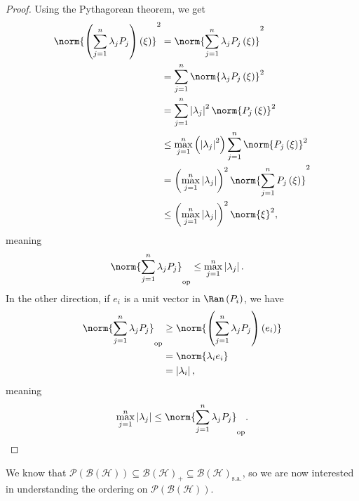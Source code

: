 \documentclass[10pt]{mypackage}
\newcommand{\sa}{\text{s.a.}}
\begin{document}
\begin{proof}
  Using the Pythagorean theorem, we get
  \begin{align*}
    \norm{\left(\sum_{j=1}^{n}\lambda_jP_j\right)\left(\xi\right)}^2 &= \norm{\sum_{j=1}^{n}\lambda_jP_j\left(\xi\right)}^2\\
                                                                     &= \sum_{j=1}^{n}\norm{\lambda_jP_j\left(\xi\right)}^2\\
                                                                     &= \sum_{j=1}^{n}\left\vert \lambda_j \right\vert^2\norm{P_j\left(\xi\right)}^2\\
                                                                     &\leq \max_{j=1}^{n}\left(\left\vert \lambda_j \right\vert^2\right)\sum_{j=1}^{n}\norm{P_j\left(\xi\right)}^2\\
                                                                     &= \left(\max_{j=1}^{n} \left\vert \lambda_j \right\vert\right)^2\norm{\sum_{j=1}^{n}P_j\left(\xi\right)}^2\\
                                                                     &\leq \left(\max_{j=1}^{n}\left\vert \lambda_j \right\vert\right)^2\norm{\xi}^2,
  \end{align*}
  meaning
  \begin{align*}
    \norm{\sum_{j=1}^{n}\lambda_jP_j}_{\text{op}} &\leq \max_{j=1}^{n}\left\vert \lambda_j \right\vert.
  \end{align*}
  In the other direction, if $e_i$ is a unit vector in $\Ran\left(P_i\right)$, we have
  \begin{align*}
    \norm{\sum_{j=1}^{n}\lambda_jP_j}_{\text{op}} &\geq \norm{\left(\sum_{j=1}^{n}\lambda_jP_j\right)\left(e_i\right)}\\
                                                  &= \norm{\lambda_ie_i}\\
                                                  &= \left\vert \lambda_i \right\vert,
  \end{align*}
  meaning
  \begin{align*}
    \max_{j=1}^{n}\left\vert \lambda_j \right\vert \leq \norm{\sum_{j=1}^{n}\lambda_jP_j}_{\text{op}}.
  \end{align*}
\end{proof}
We know that $\mathcal{P}\left(\mathcal{B}\left(\mathcal{H}\right)\right)\subseteq \mathcal{B}\left(\mathcal{H}\right)_{+}\subseteq \mathcal{B}\left(\mathcal{H}\right)_{\sa}$, so we are now interested in understanding the ordering on $\mathcal{P}\left(\mathcal{B}\left(\mathcal{H}\right)\right)$.
\end{document}
